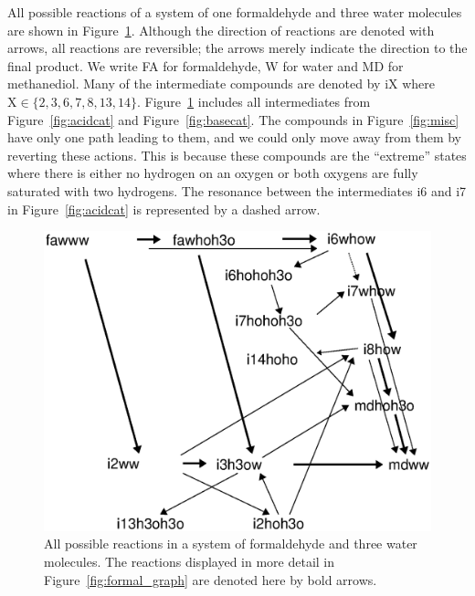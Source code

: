 All possible reactions of a system of one formaldehyde and three water molecules are shown in
Figure~\ref{fig:formalallreal}. Although the direction of reactions are denoted with arrows, all 
reactions are reversible; the arrows merely indicate the direction to the final product.
We write FA for formaldehyde, W for water and MD for methanediol. Many of the intermediate compounds
are denoted by iX where $\mathrm{X}\in\{2,3,6,7,8,13,14\}$. 
Figure~\ref{fig:formalallreal} includes all intermediates from Figure~\ref{fig:acidcat} and 
Figure~\ref{fig:basecat}. The compounds in Figure~\ref{fig:misc} have only one path leading to them, 
and we could only move away from them by 
reverting these actions. This is because these compounds are the ``extreme'' states where there is 
either no hydrogen on an oxygen or both oxygens are fully saturated with two hydrogens. 
The resonance  between the intermediates i6 and i7 in Figure~\ref{fig:acidcat}  is represented 
by a dashed arrow.

\begin{figure}[t]
  \centering
    \includegraphics[width=1.0\textwidth]{formal_all_real2}
\caption{All possible reactions in a system of formaldehyde and three water molecules. 
The reactions displayed in more detail in Figure~\ref{fig:formal_graph} are denoted here by bold
arrows.}
  \label{fig:formalallreal}
\end{figure}

